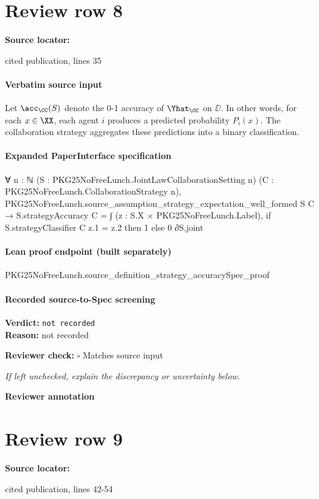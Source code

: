 \documentclass[10pt]{article}
\newcommand{\reviewerbox}{%
  \par\noindent\fbox{\parbox{0.96\linewidth}{\rule{0pt}{0.38in}}}\par
}
\newcommand{\reviewmatch}[1]{%
  \par\noindent\textbf{Reviewer check:} $\square$\; #1\par
  \noindent\emph{If left unchecked, explain the discrepancy or uncertainty below.}\par
}
\begin{document}
\section*{Review row 8}
\textbf{Source locator:} {\footnotesize\raggedright cited publication, lines 35\par}
\paragraph{Verbatim source input}
\begin{ReviewVerbatim}
Let $\acc_\CC(S)$ denote the 0-1 accuracy of $\Yhat_\CC$ on $\DD$. In other words, for each $x\in \XX$, each agent $i$ produces a predicted probability $P_i(x).$ The collaboration strategy aggregates these predictions into a binary classification.
\end{ReviewVerbatim}


\paragraph{Expanded PaperInterface specification}
\begin{ReviewVerbatim}
∀ {n : ℕ} (S : PKG25NoFreeLunch.JointLawCollaborationSetting n) (C : PKG25NoFreeLunch.CollaborationStrategy n),
  PKG25NoFreeLunch.source_assumption_strategy_expectation_well_formed S C →
    S.strategyAccuracy C =
      ∫ (z : S.X × PKG25NoFreeLunch.Label), if S.strategyClassifier C z.1 = z.2 then 1 else 0 ∂S.joint
\end{ReviewVerbatim}

\paragraph{Lean proof endpoint (built separately)}\begin{ReviewVerbatim}
PKG25NoFreeLunch.source_definition_strategy_accuracySpec_proof
\end{ReviewVerbatim}

\paragraph{Recorded source-to-Spec screening}
\textbf{Verdict:} \texttt{not recorded}
\\
\textbf{Reason:} not recorded
\reviewmatch{Matches source input}
\noindent\textbf{Reviewer annotation}\par
\reviewerbox
\clearpage
\hypertarget{source-claim-8acfa10d61ca8cac}{}
\section*{Review row 9}
\textbf{Source locator:} {\footnotesize\raggedright cited publication, lines 42-\allowbreak{}54\par}
\end{document}
